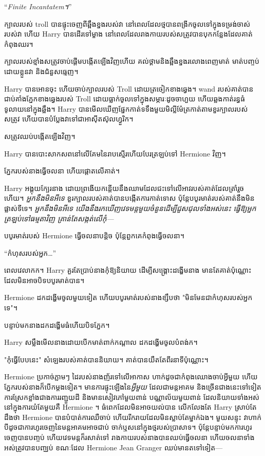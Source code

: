“\emph{Finite Incantatem។}”

ក្បាលរបស់ troll បានផ្ទុះចេញពីឆ្អឹងខ្នងរបស់វា នៅពេលដែលថ្មបានពង្រីកចូលទៅក្នុងទម្រង់ចាស់របស់វា ហើយ Harry បានដើរទៅម្ខាង នៅពេលដែលរាងកាយរបស់សត្រូវបានបុកកន្លែងដែលគាត់កំពុងឈរ។

ក្បាល​របស់​ខ្មាំង​សត្រូវ​ចាប់​ផ្ដើម​បង្កើត​ឡើង​វិញ​ហើយ គល់​ថ្គាម​និង​ឆ្អឹងខ្នង​រលោង​ពេញ​មាត់ មាត់​បញ្ចប់​ដោយ​ខ្លួន​វា និង​ជំនួស​ធ្មេញ។

Harry បាន​អោន​ចុះ ហើយ​ចាប់​ក្បាល​របស់ Troll ដោយ​ត្រចៀក​ខាង​ឆ្វេង។ wand របស់គាត់បានជាប់គាំងភ្នែកខាងឆ្វេងរបស់ Troll ដោយធ្លាក់ចូលទៅក្នុងសម្ភារៈដូចចាហួយ ហើយឆ្លងកាត់រន្ធធំទូលាយនៅក្នុងឆ្អឹង។ Harry បាន​មើល​ឃើញ​ផ្នែក​កាត់​ទទឹង​មួយ​មិល្លីម៉ែត្រ​កាត់​តាម​ខួរ​ក្បាល​របស់​សត្រូវ ហើយ​បាន​បំប្លែង​វា​ទៅ​ជា​អាស៊ីត​ស៊ុលហ្វួរិក។

សត្រូវឈប់បង្កើតឡើងវិញ។

Harry បានបោះសាកសពនៅលើគែមនៃរាបស្មើរហើយបែរត្រឡប់ទៅ Hermione វិញ។

ភ្នែក​របស់​នាង​ធ្វើ​ចលនា ហើយ​ផ្តោត​លើ​គាត់។

Harry អង្គុយក្បែរនាង ដោយព្រងើយកន្តើយនឹងឈាមដែលជះទៅលើអាវរបស់គាត់ដែលត្រាំរួចហើយ។ \emph{អ្នកនឹងមិនអីទេ} ខួរក្បាលរបស់គាត់បានបង្កើតការកាត់ទោស ប៉ុន្តែបបូរមាត់របស់គាត់នឹងមិនផ្លាស់ទីទេ។ \emph{អ្នកនឹងមិនអីទេ យើងនឹងរកឃើញវេទមន្តមួយចំនួនដើម្បីជួសជុលទាំងអស់នេះ ធ្វើឱ្យអ្នកត្រឡប់ទៅធម្មតាវិញ គ្រាន់តែសង្កត់លើកុំ—}

បបូរមាត់របស់ Hermione ធ្វើចលនាបន្តិច ប៉ុន្តែពួកគេកំពុងធ្វើចលនា។

“កំហុសរបស់អ្នក…”

ពេលវេលាកក។ Harry គួរ​តែ​ប្រាប់​នាង​កុំ​ឱ្យ​និយាយ ដើម្បី​សង្គ្រោះ​ដង្ហើម​នាង មានតែ​គាត់​ប៉ុណ្ណោះ​ដែល​មិន​អាច​បិទ​បបូរមាត់​បាន។

Hermione ដកដង្ហើមចូលមួយទៀត ហើយបបូរមាត់របស់នាងខ្សឹបថា "មិនមែនជាកំហុសរបស់អ្នកទេ"។

បន្ទាប់មកនាងដកដង្ហើមធំហើយបិទភ្នែក។

Harry សម្លឹងមើលនាងដោយបើកមាត់ពាក់កណ្តាល ដកដង្ហើមចូលបំពង់ក។

"កុំធ្វើបែបនេះ" សំឡេងរបស់គាត់បាននិយាយ។ គាត់​បាន​យឺត​តែ​ពីរ​នាទី​ប៉ុណ្ណោះ។

Hermione ប្រកាច់ភ្លាមៗ ដៃរបស់នាងញ័រទៅលើអាកាស ហាក់ដូចជាកំពុងឈោងចាប់អ្វីមួយ ហើយភ្នែករបស់នាងក៏បើកម្តងទៀត។ មានការផ្ទុះឡើងនៃ\emph{អ្វីមួយ} ដែលជាមន្តអាគម និងច្រើនជាងនេះទៅទៀត ការស្រែកខ្លាំងជាងការរញ្ជួយដី និងមានសៀវភៅមួយពាន់ បណ្ណាល័យមួយពាន់ ដែលនិយាយទាំងអស់នៅក្នុងការយំតែមួយគឺ Hermione ។ ធំពេកដែលមិនអាចយល់បាន លើកលែងតែ Harry ស្រាប់តែដឹងថា Hermione បានបំបាត់ការឈឺចាប់ ហើយរីករាយដែលមិនស្លាប់តែម្នាក់ឯង។ មួយសន្ទុះ វាហាក់បីដូចជាការហូរចេញនៃមន្តអាគមអាចជាប់ ចាក់ឬសនៅក្នុងថ្មរបស់ប្រាសាទ។ ប៉ុន្តែ​បន្ទាប់មក​ការហូរ​ចេញ​បាន​បញ្ចប់ ហើយ​វេទមន្ត​ក៏​រសាត់​ទៅ រាងកាយ​របស់​នាង​បាន​ឈប់​ធ្វើ​ចលនា ហើយ​ចលនា​ទាំងអស់​ត្រូវ​បាន​បញ្ឈប់ ខណៈ​ដែល Hermione Jean Granger ឈប់​មាន​តទៅ​ទៀត—

